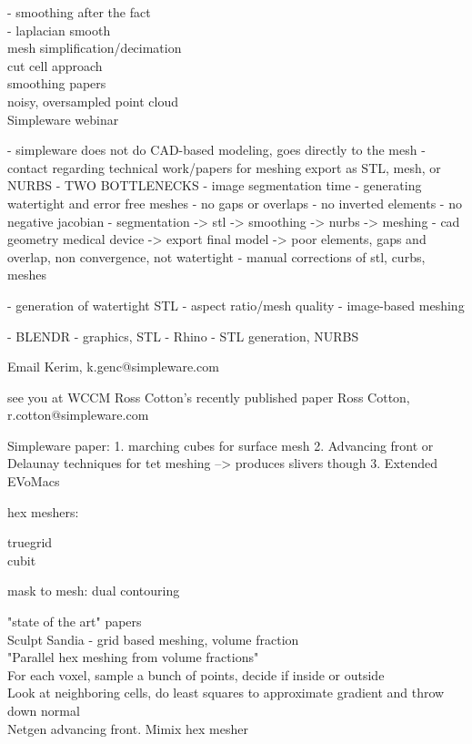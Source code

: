 - smoothing after the fact\\
	- laplacian smooth\\

mesh simplification/decimation\\
cut cell approach\\
smoothing papers\\

noisy, oversampled point cloud\\


Simpleware webinar

- simpleware does not do CAD-based modeling, goes directly to the mesh
- contact regarding technical work/papers for meshing
export as STL, mesh, or NURBS
- TWO BOTTLENECKS
  - image segmentation time
  - generating watertight and error free meshes
    - no gaps or overlaps 
    - no inverted elements 
    - no negative jacobian
- segmentation -> stl -> smoothing -> nurbs -> meshing -  cad geometry medical device -> export final model -> poor elements, gaps and overlap, non convergence, not watertight
- manual corrections of stl, curbs, meshes

- generation of watertight STL
- aspect ratio/mesh quality
- image-based meshing

- BLENDR - graphics, STL
- Rhino - STL generation, NURBS

Email Kerim, k.genc@simpleware.com

see you at WCCM
Ross Cotton’s recently published paper
Ross Cotton, r.cotton@simpleware.com

Simpleware paper:
1. marching cubes for surface mesh
2. Advancing front or Delaunay techniques for tet meshing --> produces slivers though
3. Extended EVoMacs

hex meshers:

truegrid\\
cubit

mask to mesh:
dual contouring

"state of the art" papers\\
Sculpt Sandia - grid based meshing, volume fraction \\
"Parallel hex meshing from volume fractions"\\
For each voxel, sample a bunch of points, decide if inside or outside \\
Look at neighboring cells, do least squares to approximate gradient and throw down normal \\

Netgen advancing front. Mimix hex mesher \\

